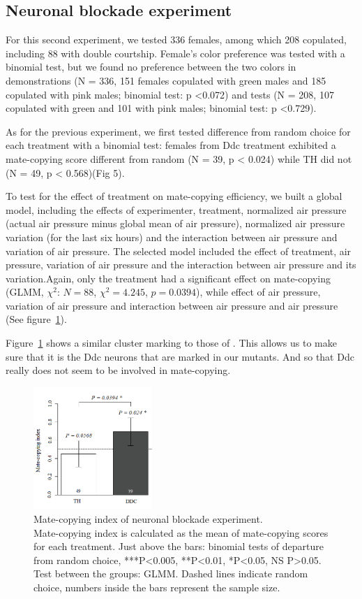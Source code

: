 \documentclass[a4paper, 12pt]{article}
\begin{document}
\subsection{Neuronal blockade experiment}

For this second experiment, we tested 336 females, among which 208 copulated, including 88 with double courtship. Female's color preference was tested with a binomial test, but we found no preference between the two colors in demonstrations (N = 336, 151 females copulated with green males and 185 copulated with pink males; binomial test: p {\textless}0.072) and tests (N = 208, 107 copulated with green and 101 with pink males; binomial test: p {\textless}0.729).

As for the previous experiment, we first tested difference from random choice for each treatment with a binomial test: females from Ddc treatment exhibited a mate-copying score different from random (N = 39, p {\textless} 0.024) while TH did not (N = 49, p {\textless} 0.568)(Fig 5).

To test for the effect of treatment on mate-copying efficiency, we built a global model, including the effects of experimenter, treatment, normalized air pressure (actual air pressure minus global mean of air pressure), normalized air pressure variation (for the last six hours) and the interaction between air pressure and variation of air pressure. The selected model included the effect of treatment, air pressure, variation of air pressure and the interaction between air pressure and its variation.Again, only the treatment had a significant effect on mate-copying (GLMM, $\chi^2$: $N = 88$, $\chi^2 = 4.245$, $p = 0.0394$), while effect of air pressure, variation of air pressure and interaction between air pressure and air pressure (See figure~\ref{fig:mcnb}).

Figure~\ref{fig:mcnb} shows a similar cluster marking to those of \textcite{liu_subset_2012}. This allows us to make sure that it is the Ddc neurons that are marked in our mutants. And so that Ddc really does not seem to be involved in mate-copying.

\begin{figure}
	\centering
	\includegraphics[width=0.4\textwidth]{images/mcnb}
	\caption{Mate-copying index of neuronal blockade experiment. \\
		Mate-copying index is calculated as the mean of mate-copying scores for each treatment. Just above the bars: binomial tests of departure from random choice, ***P<0.005, **P<0.01, *P<0.05, NS P>0.05. Test between the groups: GLMM. Dashed lines indicate random choice, numbers inside the bars represent the sample size.}
	\label{fig:mcnb}
\end{figure}
\end{document}
